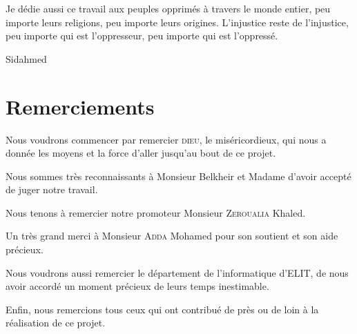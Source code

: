 Je dédie aussi ce travail aux peuples opprimés à travers le monde entier, peu importe leurs religions, peu importe
leurs origines. L'injustice reste de l'injustice, peu importe qui est l'oppresseur, peu importe qui est l'oppressé.

\vfill
Sidahmed
\vfill






\chapter*{Remerciements}
Nous voudrons commencer par remercier \textsc{dieu}, le miséricordieux, qui nous a donnée les moyens et la force
d'aller jusqu'au bout de ce projet.

Nous sommes très reconnaissants à Monsieur Belkheir et Madame d'avoir accepté de juger notre travail.

Nous tenons à remercier notre promoteur Monsieur \textsc{Zeroualia} Khaled.

Un très grand merci à Monsieur \textsc{Adda} Mohamed pour son soutient et son aide précieux. %

Nous voudrons aussi remercier le département de l'informatique d'ELIT, de nous avoir accordé un moment précieux de
leurs temps inestimable.

Enfin, nous remercions tous ceux qui ont contribué de près ou de loin à la réalisation de ce projet.

